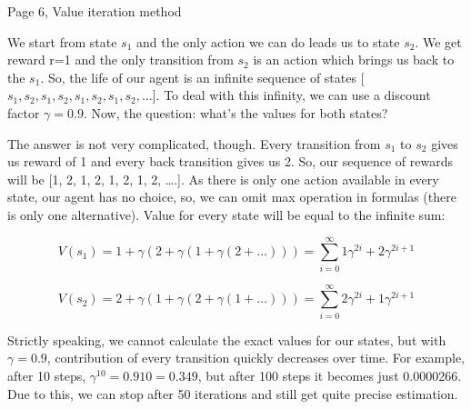 Page 6, Value iteration method

We start from state \begin{math}s_1\end{math} and the only action we can do leads us to state \begin{math}s_2\end{math}. We
get reward r=1 and the only transition from \begin{math}s_2\end{math} is an action which brings us back
to the \begin{math}s_1\end{math}. So, the life of our agent is an infinite sequence of states [
\begin{math}s_1, s_2, s_1, s_2, s_1, s_2, s_1, s_2,\ldots\end{math}]. To deal with this infinity, we can use a discount
factor \begin{math}\gamma=0.9\end{math}. Now, the question: what’s the values for both states?

The answer is not very complicated, though. Every transition from \begin{math}s_1\end{math} to \begin{math}s_2\end{math} gives
us reward of 1 and every back transition gives us 2. So, our sequence of rewards
will be [1, 2, 1, 2, 1, 2, 1, 2, ….]. As there is only one action available in
every state, our agent has no choice, so, we can omit max operation in formulas
(there is only one alternative). Value for every state will be equal to the
infinite sum:


\begin{equation*}
V(s_1) = 1 + \gamma (2 + \gamma(1 + \gamma(2 + \ldots))) = \sum_{i=0}^\infty 1\gamma^{2i}+2\gamma^{2i+1}
\end{equation*}


\begin{equation*}
V(s_2) = 2 + \gamma (1 + \gamma(2 + \gamma(1 + \ldots))) = \sum_{i=0}^\infty 2\gamma^{2i}+1\gamma^{2i+1}
\end{equation*}

Strictly speaking, we cannot calculate the exact values for our states, but with
\begin{math}\gamma=0.9\end{math}, contribution of every transition quickly decreases over time. For
example, after 10 steps, \begin{math}\gamma^{10} = 0.910 = 0.349\end{math}, but after 100 steps it becomes just
0.0000266. Due to this, we can stop after 50 iterations and still get quite
precise estimation.



